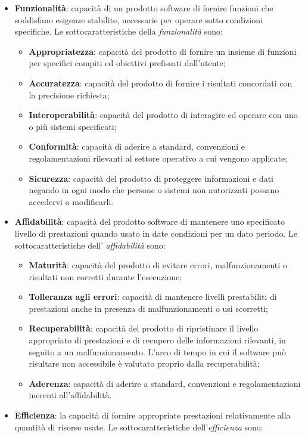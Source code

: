 \begin{itemize}
\item \textbf{Funzionalità}: capacità di un prodotto software di fornire funzioni che soddisfano esigenze stabilite, necessarie per operare sotto condizioni specifiche. Le sottocaratteristiche della \textit{funzionalità} sono:
	\begin{itemize}
	\item \textbf{Appropriatezza}: capacità del prodotto di fornire un insieme di funzioni per specifici compiti ed obiettivi prefissati dall'utente;
	\item \textbf{Accuratezza}: capacità del prodotto di fornire i risultati concordati con la precisione richiesta;
	\item \textbf{Interoperabilità}: capacità del prodotto di interagire ed operare con uno o più sistemi specificati;
	\item \textbf{Conformità}: capacità di aderire a standard, convenzioni e regolamentazioni rilevanti al settore operativo a cui vengono applicate;
	\item \textbf{Sicurezza}: capacità del prodotto di proteggere informazioni e dati negando in ogni modo che persone o sistemi non autorizzati possano accedervi o modificarli.
	\end{itemize}
\item \textbf{Affidabilità}: capacità del prodotto software di mantenere uno specificato livello di prestazioni quando usato in date condizioni per un dato periodo. Le sottocaratteristiche dell' \textit{affidabilità} sono:
	\begin{itemize}
	\item \textbf{Maturità}: capacità del prodotto di evitare errori, malfunzionamenti o risultati non corretti durante l'esecuzione;
	\item \textbf{Tolleranza agli errori}: capacità di mantenere livelli prestabiliti di prestazioni anche in presenza di malfunzionamenti o usi scorretti;
	\item \textbf{Recuperabilità}: capacità del prodotto di ripristinare il livello appropriato di prestazioni e di recupero delle informazioni rilevanti, in seguito a un malfunzionamento. L'arco di tempo in cui il software può risultare non accessibile è valutato proprio dalla recuperabilità;
	\item \textbf{Aderenza}: capacità di aderire a standard, convenzioni e regolamentazioni inerenti all'affidabilità.
	\end{itemize}
\item \textbf{Efficienza}: la capacità di fornire appropriate prestazioni relativamente alla quantità di risorse usate. Le sottocaratteristiche dell'\textit{efficienza} sono:

\end{itemize}
